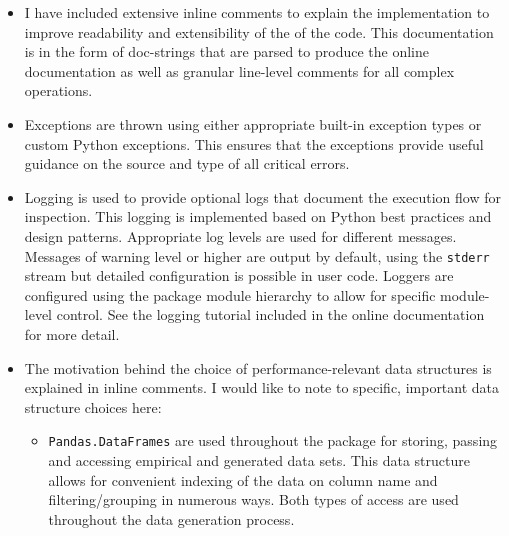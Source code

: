 \documentclass[../main.tex]{subfiles}
\begin{document}
\begin{itemize}
    \item I have included extensive inline comments to explain the implementation to improve readability and extensibility of the of the code. This documentation is in the form of doc-strings that are parsed to produce the online documentation as well as granular line-level comments for all complex operations.
    
    \item Exceptions are thrown using either appropriate built-in exception types or custom Python exceptions. This ensures that the exceptions provide useful guidance on the source and type of all critical errors.
    
    \item Logging is used to provide optional logs that document the execution flow for inspection.  This logging is implemented based on Python best practices and design patterns. Appropriate log levels are used for different messages. Messages of warning level or higher are output by default, using the \texttt{stderr} stream but detailed configuration is possible in user code. Loggers are configured using the package module hierarchy to allow for specific module-level control. See the logging tutorial included in the online documentation for more detail.
    
    \item The motivation behind the choice of performance-relevant data structures is explained in inline comments. I would like to note to specific, important data structure choices here:
    
    \begin{itemize}
        \item \texttt{Pandas.DataFrames} are used throughout the package for storing, passing and accessing empirical and generated data sets. This data structure allows for convenient indexing of the data on column name and filtering/grouping in numerous ways. Both types of access are used throughout the data generation process.
        

\end{itemize}
\end{itemize}
\end{document}
